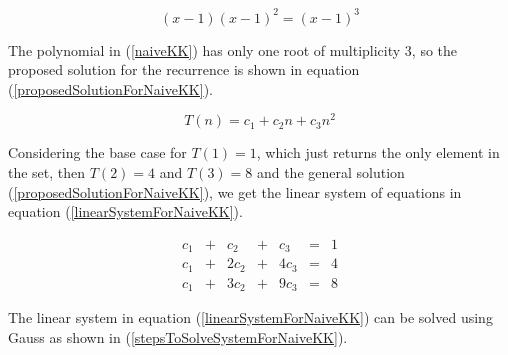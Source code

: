\documentclass[tikz, 12pt]{scrartcl}
\begin{document}
\begin{equation}\label{naiveKK}
(x - 1)(x - 1)^2 = (x - 1)^3
\end{equation}

The polynomial in (\ref{naiveKK}) has only one root of multiplicity 3, so the proposed solution for the recurrence is shown in equation (\ref{proposedSolutionForNaiveKK}).

\begin{equation}\label{proposedSolutionForNaiveKK}
T(n)	=	c_1 + c_2 n + c_3 n^2
\end{equation}

Considering the base case for $T(1) = 1$, which just returns the only element in the set, then $T(2) = 4$ and $T(3) = 8$ and the general solution (\ref{proposedSolutionForNaiveKK}), we get the linear system of equations in equation (\ref{linearSystemForNaiveKK}).

\begin{equation}\label{linearSystemForNaiveKK}
\begin{array}{ccccccc}
c_1		&	+	&	c_2		&	+	&	c_3		&	=	&	1\\
c_1		&	+	&	2c_2	&	+	&	4c_3	&	=	&	4\\
c_1		&	+	&	3c_2	&	+	&	9c_3	&	=	&	8
\end{array}
\end{equation}

The linear system in equation (\ref{linearSystemForNaiveKK}) can be solved using Gauss as shown in (\ref{stepsToSolveSystemForNaiveKK}).
\end{document}
